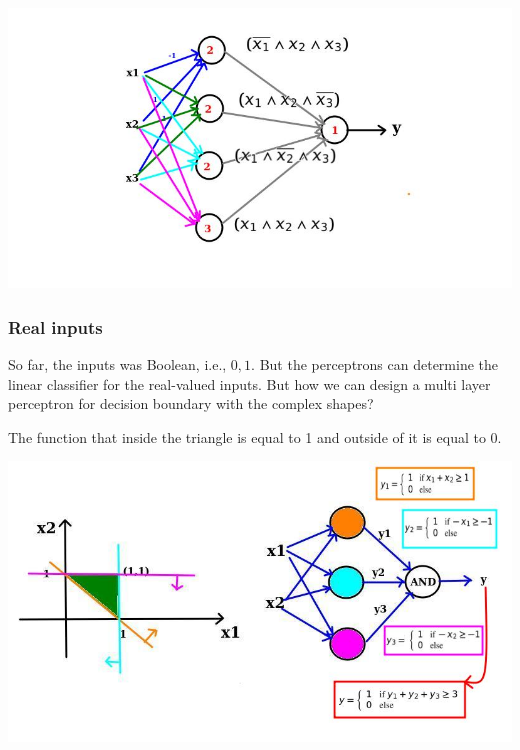 \documentclass[12pt,aspectratio=169]{beamer}
\begin{document}
\begin{frame}
\begin{center}
\includegraphics[scale=0.6]{dnf}
\end{center}
\end{frame}

\begin{frame}
\frametitle{Real inputs}
So far, the inputs was Boolean, i.e., $0, 1$. But the perceptrons can determine the linear classifier for the real-valued inputs. But how we can design a multi layer perceptron for decision boundary with the complex shapes?
\end{frame}



\begin{frame}
The function that inside the triangle is equal to 1 and outside of it is equal to 0.
\begin{center}
\includegraphics[scale=0.6]{triangle}
\end{center}

\end{frame}
\end{document}
